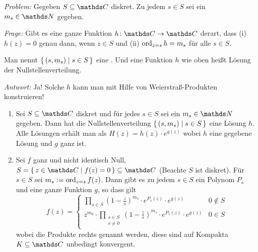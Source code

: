 \emph{Problem:} Gegeben $S\subseteq \CC$ diskret. Zu jedem $s\in S$ sei ein $m_s \in \NN$ gegeben.

\emph{Frage:} Gibt es eine ganze Funktion $h\colon \CC \ra \CC$ derart, dass (i) $h(z) = 0$ genau dann, wenn $z\in S$ und (ii) $\operatorname*{ord}_{z=s} h = m_s$ für alle $s \in S$.

Man nennt $\left\{\,(s, m_s) \mid s\in S\,\right\}$ eine .
Und eine Funktion $h$ wie oben heißt Lösung der Nullstellenverteilung.

\emph{Antwort:} Ja! Solche $h$ kann man mit Hilfe von Weierstraß-Produkten konstruieren!


\begin{satz}\label{satz:weierstrasprodukt}
\begin{enumerate}
\item Sei $S\subseteq \CC$ diskret und für jedes $s\in S$ sei ein $m_s \in \NN$ gegeben. Dann hat die Nullstellenverteilung $\left\{\,(s, m_s) \mid s\in S\,\right\}$ eine Lösung $h$.
Alle Lösungen erhält man als $H(z) = h(z)\cdot e^{g(z)}$ wobei $h$ eine gegebene Lösung und $g$ ganz ist.

\item Sei $f$ ganz und nicht identisch Null, $S=\Set{z\in\CC \mid f(z) = 0}\subseteq\CC$ (Beachte $S$ ist diskret).
Für $s\in S$ sei $m_s := \operatorname*{ord}_{z=s} f(z)$.
Dann gibt es zu jedem $s\in S$ ein Polynom $P_s$ und eine ganze Funktion $g$, so dass gilt
\[
	f(z) =
	\begin{cases}
		\displaystyle \prod_{s\in S} \left(1-\frac{z}{s}\right)^{m_s}\cdot e^{P_s(z)}\cdot e^{g(z)} & 0 \not\in S \\
		\displaystyle z^{m_0} \cdot \prod_{\substack{s\in S\\ \scriptscriptstyle s\not=0}} \left(1-\frac{z}{s}\right)^{m_s}\cdot e^{P_s(z)}\cdot e^{g(z)} & 0 \in S
	\end{cases}
\]
wobei die Produkte rechts  genannt werden, diese sind auf Kompakta $K\subseteq \CC$ unbedingt konvergent.
\end{enumerate}
\end{satz}

